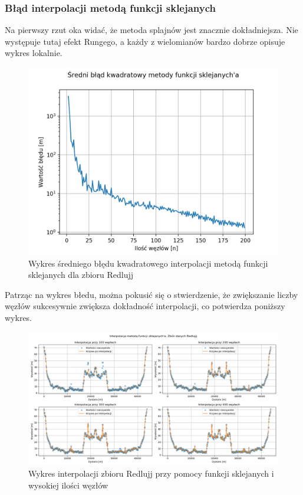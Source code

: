 \documentclass{article} %
\begin{document}
\subsubsection{Błąd interpolacji metodą funkcji sklejanych}
Na pierwszy rzut oka widać, że metoda splajnów jest znacznie dokładniejsza. Nie występuje tutaj efekt Rungego, a każdy z wielomianów bardzo dobrze opisuje wykres lokalnie.
\begin{figure}[H]
   \centering
   \includegraphics[scale=0.7]{../plots/error_splines_Redlujjj.png}
   \caption{Wykres średniego błędu kwadratowego interpolacji metodą funkcji sklejanych dla zbioru Redlujj} 
\end{figure}
Patrząc na wykres błedu, można pokusić się o stwierdzenie, że zwiększanie liczby węzłów sukcesywnie zwiększa dokładność interpolacji, co potwierdza poniższy wykres.
\begin{figure}[H]
    \centering
    \includegraphics[scale=0.5]{../plots/splines_accurate_Redlujjj.png}
    \caption{Wykres interpolacji zbioru Redlujj przy pomocy funkcji sklejanych i wysokiej ilości węzłów}
\end{figure}
\end{document}
